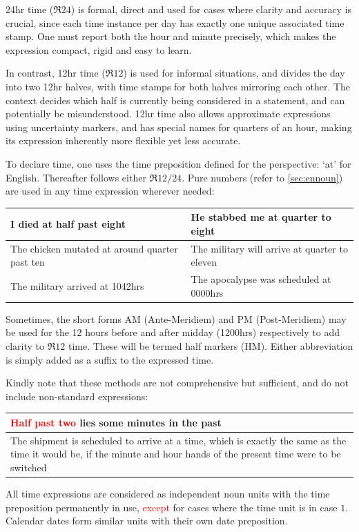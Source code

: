 24hr time ($\mathfrak{R}24$) is formal, direct and used for cases where clarity and accuracy is crucial, since each time instance per day has exactly one unique associated time stamp. One must report both the hour and minute precisely, which makes the expression compact, rigid and easy to learn.

In contrast, 12hr time ($\mathfrak{R}12$) is used for informal situations, and divides the day into two 12hr halves, with time stamps for both halves mirroring each other. The context decides which half is currently being considered in a statement, and can potentially be misunderstood. 12hr time also allows approximate expressions using uncertainty markers, and has special names for  quarters of an hour, making its expression  inherently more flexible yet less accurate.

To declare  time, one  uses the time preposition defined for the perspective: `at' for English. Thereafter follows either $\mathfrak{R}12/24$. Pure numbers (refer to \autoref{sec:ennoun}) are used in any time expression wherever needed:
\begin{example}
    \begin{tabular}{m{6.5cm}|m{7cm}}
        I died at half past eight & He stabbed me at quarter to eight\\\hline
        The chicken mutated at around quarter past ten & The military will arrive at quarter to eleven\\\hline
        The military arrived at 1042hrs & The apocalypse was scheduled at 0000hrs
    \end{tabular}
\end{example}
Sometimes, the short forms AM (Ante-Meridiem)  and PM (Post-Meridiem) may be used for the 12 hours before and after midday (1200hrs) respectively to add clarity to $\mathfrak{R}12$ time. These will be termed half markers (HM). Either abbreviation is simply added as a suffix to the expressed time.

Kindly note that these methods are not comprehensive but sufficient, and do not include non-standard expressions:
\begin{example}
    \begin{tabular}{m{14cm}}
    \textcolor{red}{Half past two} lies some minutes in the past\\\hline The shipment is scheduled to arrive at a time, which is exactly the same as the time it would be, if the minute and hour hands of the present time were to be switched
    \end{tabular}
\end{example}
All time expressions are  considered as  independent noun units with the  time preposition permanently in use, \textcolor{red}{except} for  cases where the time unit is in case $1$. Calendar dates form similar units with their own date preposition.  

